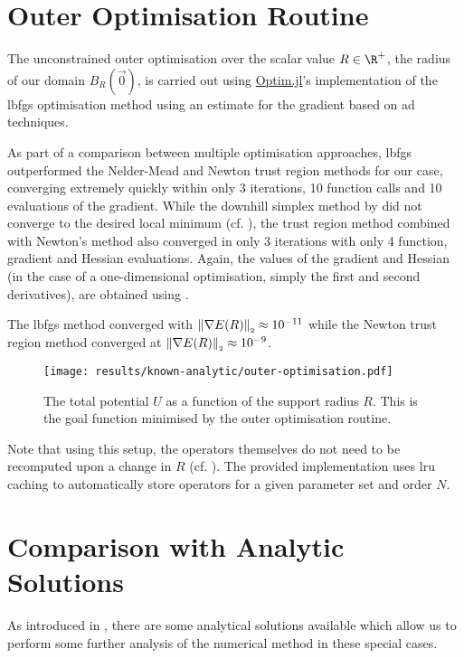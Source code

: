 \section{Outer Optimisation Routine}
The unconstrained outer optimisation over the scalar value $R \in \R^+$, the radius of our domain $B_R(\vec{0})$, is carried out using \href{https://github.com/JuliaNLSolvers/Optim.jl}{Optim.jl}'s implementation \parencite{2023-optim-jl} of the \gls{lbfgs} optimisation method \parencite{1989-lbfgs} using an estimate for the gradient based on \gls{ad} techniques.

As part of a comparison between multiple optimisation approaches, \gls{lbfgs} outperformed the Nelder-Mead and Newton trust region methods for our case, converging extremely quickly within only 3 iterations, 10 function calls and 10 evaluations of the gradient.
While the downhill simplex method by \citeauthor{1965-nelder-mead} did not converge to the desired local minimum (cf. ), the trust region method combined with Newton's method \parencite{1982-trust-region} also converged in only 3 iterations with only 4 function, gradient and Hessian evaluations.
Again, the values of the gradient and Hessian (in the case of a one-dimensional optimisation, simply the first and second derivatives), are obtained using .

The \gls{lbfgs} method converged with $\left\lVert\nabla E(R)\right\rVert_{\scriptscriptstyle 2} \approx 10^{-11}$ while the Newton trust region method converged at $\left\lVert\nabla E(R)\right\rVert_{\scriptscriptstyle 2} \approx 10^{-9}$.

\begin{figure}[H]
  \centering
  \texttt{[image: results/known-analytic/outer-optimisation.pdf]}
  \caption[Outer Optimisation Routine]{The total potential $U$ as a function of the support radius $R$. This is the goal function minimised by the outer optimisation routine.}
  \label{fig:outer-optimisation}
\end{figure}

Note that using this setup, the operators themselves do not need to be recomputed upon a change in $R$ (cf. ).
The provided implementation uses \gls{lru} caching to automatically store operators for a given parameter set and order $N$.

\pagebreak
\section{Comparison with Analytic Solutions}
As introduced in , there are some analytical solutions available which allow us to perform some further analysis of the numerical method in these special cases.

